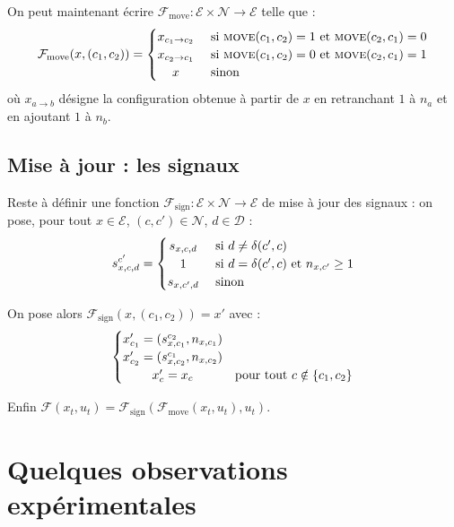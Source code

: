 \documentclass[11pt, openany]{article}
\newcommand{\Ne}{\mathcal{N}}
\newcommand{\D}{\mathcal{D}}
\newcommand{\M}{\textsc{move}}
\newcommand{\E}{\mathcal{E}}
\begin{document}
\medskip

\noindent
On peut maintenant écrire $\mathcal{F}_{\mathrm{move}} : \E\times\Ne\to\E$ telle que :  \[
\mathcal{F}_{\mathrm{move}}(x,(c_1, c_2)) = 
\begin{cases}
  \hfill x_{c_1\to c_2} \hfill & \text{ si $\M(c_1, c_2) = 1$ et $\M(c_2, c_1) = 0$} \\
  \hfill x_{c_2 \to c_1} \hfill & \text{ si $\M(c_1, c_2) = 0$ et $\M(c_2, c_1) = 1$} \\
  \hfill x \hfill & \text{ sinon} \\
  \end{cases}
\]
où $x_{a \to b}$ désigne la configuration obtenue à partir de $x$ en retranchant $1$ à $n_{a}$ et en ajoutant $1$ à $n_{b}$. 

\medskip

\subsection*{Mise à jour : les signaux}  

\noindent 
Reste à définir une fonction $\mathcal{F}_{\mathrm{sign}} : \E\times\Ne\to\E$ de mise à jour des signaux : on pose, pour tout $x\in\E$, $(c,c')\in\Ne$, $d\in\D$ : \[
s_{x, c, d}^{c'} = 
\begin{cases}
  \hfill s_{x, c, d} \hfill & \text{ si $d \neq \delta(c', c)$} \\
  \hfill 1 \hfill & \text{ si $d = \delta(c', c)$ et $n_{x, c'}\geq 1$} \\
  \hfill s_{x, c', d} \hfill & \text{ sinon}\\
\end{cases}
\]

\noindent
On pose alors $\mathcal{F}_{\mathrm{sign}} (x, (c_1, c_2)) = x'$ avec : \[
\begin{cases}
  \hfill x'_{c_1} = (s_{x, c_1}^{c_2}, n_{x,c_1}) \hfill & \\
  \hfill x'_{c_2} = (s_{x, c_2}^{c_1}, n_{x, c_2}) \hfill & \\
  \hfill x'_c = x_c  \hfill & \text{pour tout $c \notin \{ c_1, c_2\}$} \\
\end{cases}
\]

\bigskip

\noindent
Enfin $\mathcal{F}(x_t, u_t) = \mathcal{F}_{\mathrm{sign}}(\mathcal{F}_{\mathrm{move}}(x_t, u_t), u_t)$.

\section*{Quelques observations expérimentales}
\end{document}
